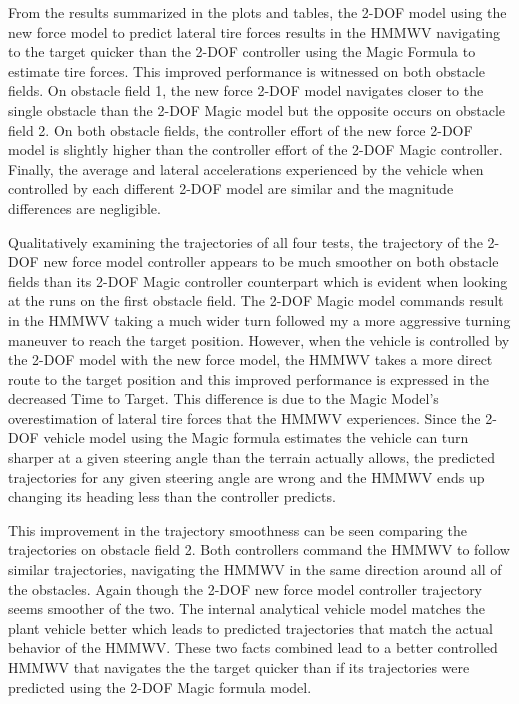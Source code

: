 \documentclass[12pt,onecolumn]{report}
\begin{document}
From the results summarized in the plots and tables, the 2-DOF model using the new force model to predict lateral tire forces results in the HMMWV navigating to the target quicker than the 2-DOF controller using the Magic Formula to estimate tire forces. This improved performance is witnessed on both obstacle fields. On obstacle field 1, the new force 2-DOF model navigates closer to the single obstacle than the 2-DOF Magic model but the opposite occurs on obstacle field 2. On both obstacle fields, the controller effort of the new force 2-DOF model is slightly higher than the controller effort of the 2-DOF Magic controller. Finally, the average and lateral accelerations experienced by the vehicle when controlled by each different 2-DOF model are similar and the magnitude differences are negligible. 

Qualitatively examining the trajectories of all four tests, the trajectory of the 2-DOF new force model controller appears to be much smoother on both obstacle fields than its 2-DOF Magic controller counterpart which is evident when looking at the runs on the first obstacle field. The 2-DOF Magic model commands result in the HMMWV taking a much wider turn followed my a more aggressive turning maneuver to reach the target position. However, when the vehicle is controlled by the 2-DOF model with the new force model, the HMMWV takes a more direct route to the target position and this improved performance is expressed in the decreased Time to Target. This difference is due to the Magic Model's overestimation of lateral tire forces that the HMMWV experiences. Since the 2-DOF vehicle model using the Magic formula estimates the vehicle can turn sharper at a given steering angle than the terrain actually allows, the predicted trajectories for any given steering angle are wrong and the HMMWV ends up changing its heading less than the controller predicts. 

This improvement in the trajectory smoothness can be seen comparing the trajectories on obstacle field 2. Both controllers command the HMMWV to follow similar trajectories, navigating the HMMWV in the same direction around all of the obstacles. Again though the 2-DOF new force model controller trajectory seems smoother of the two. The internal analytical vehicle model matches the plant vehicle better which leads to predicted trajectories that match the actual behavior of the HMMWV. These two facts combined lead to a better controlled HMMWV that navigates the the target quicker than if its trajectories were predicted using the 2-DOF Magic formula model. 
\end{document}
